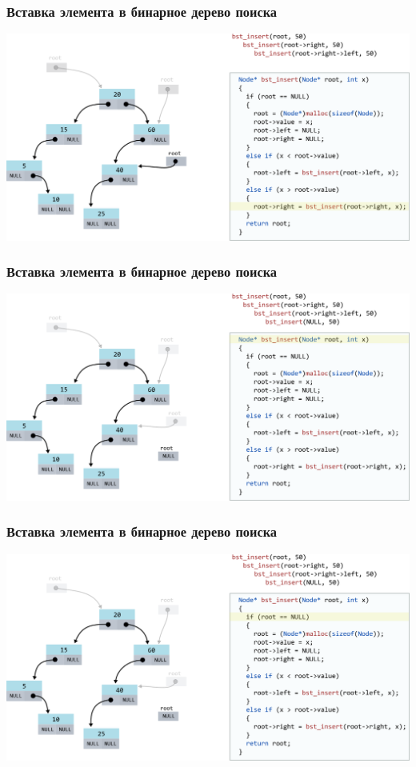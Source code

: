 \documentclass[10pt,pdf,hyperref={unicode}]{beamer}
\begin{document}
\begin{frame}[fragile]
\frametitle{Вставка элемента в бинарное дерево поиска}
\begin{center}
\includegraphics[scale=0.6]{images/tree/codetree/codetree9.png}
\end{center}
\end{frame}
\begin{frame}[fragile]
\frametitle{Вставка элемента в бинарное дерево поиска}
\begin{center}
\includegraphics[scale=0.6]{images/tree/codetree/codetree10.png}
\end{center}
\end{frame}
\begin{frame}[fragile]
\frametitle{Вставка элемента в бинарное дерево поиска}
\begin{center}
\includegraphics[scale=0.6]{images/tree/codetree/codetree11.png}
\end{center}
\end{frame}
\end{document}

